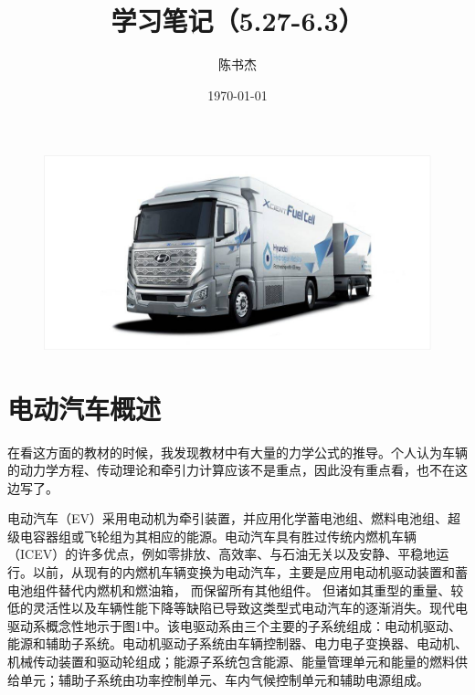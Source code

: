 \documentclass[UTF8,a4paper,11pt]{article}
\title{\huge\heiti 学习笔记（5.27-6.3）}
\author{陈书杰}
\date{\today}
\begin{document}
\maketitle
\thispagestyle{empty}
\begin{figure}[htbp]
\centering
\includegraphics[scale=0.3]{first.jpg}
\end{figure}
\clearpage

\tableofcontents
\setcounter{page}{1}

\clearpage

\setcounter{page}{1}
\section{电动汽车概述}
在看这方面的教材的时候，我发现教材中有大量的力学公式的推导。个人认为车辆的动力学方程、传动理论和牵引力计算应该不是重点，因此没有重点看，也不在这边写了。

电动汽车（EV）采用电动机为牵引装置，并应用化学蓄电池组、燃料电池组、超级电容器组或飞轮组为其相应的能源。电动汽车具有胜过传统内燃机车辆（ICEV）的许多优点，例如零排放、高效率、与石油无关以及安静、平稳地运行。以前，从现有的内燃机车辆变换为电动汽车，主要是应用电动机驱动装置和蓄电池组件替代内燃机和燃油箱， 而保留所有其他组件。 但诸如其重型的重量、较低的灵活性以及车辆性能下降等缺陷已导致这类型式电动汽车的逐渐消失。现代电驱动系概念性地示于图1中。该电驱动系由三个主要的子系统组成：电动机驱动、能源和辅助子系统。电动机驱动子系统由车辆控制器、电力电子变换器、电动机、机械传动装置和驱动轮组成；能源子系统包含能源、能量管理单元和能量的燃料供给单元；辅助子系统由功率控制单元、车内气候控制单元和辅助电源组成。
\end{document}
